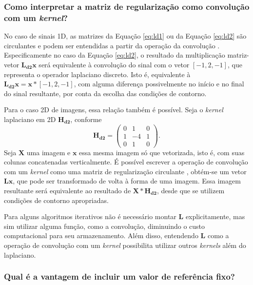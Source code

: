 \subsubsection{Como interpretar a matriz de regularização como convolução com um \textit{kernel}?}

No caso de sinais 1D, as matrizes da Equação \eqref{eq:ld1}  ou da Equação \eqref{eq:ld2} são circulantes e podem ser entendidas a partir da operação da convolução \cite[pág. 232]{aster2019parameter}. Especificamente no caso da Equação \eqref{eq:ld2}, o resultado da multiplicação matriz-vetor $\mathbf{L_{d2}} \mathbf{x}$ será equivalente à convolução do sinal com o vetor $[-1 , 2, -1]$, que representa o operador laplaciano discreto. Isto é, equivalente à $\mathbf{L_{d2}} \mathbf{x} = \mathbf{x} * [-1 , 2, -1]$, com alguma diferença possivelmente no início e no final do sinal resultante, por conta da escolha das condições de contorno.

 Para o caso 2D de imagens, essa relação também é possível. Seja o \textit{kernel} laplaciano em 2D $\mathbf{H_{d2}}$, conforme 
\begin{equation}
\mathbf{H_{d2}} = \begin{pmatrix}
0 & 1 & 0  \\
1 & -4 & 1\\
0 & 1 & 0 
\end{pmatrix}.
\label{eq:hd2}
\end{equation}
Seja $\mathbf{X}$ uma imagem e $\mathbf{x}$ essa mesma imagem só que vetorizada, isto é, com suas colunas concatenadas verticalmente. É possível escrever a operação de convolução com um \textit{kernel} como uma matriz de regularização circulante \cite[pág. 177]{hansen2010discrete}, obtém-se um vetor $\mathbf{L} \mathbf{x}$, que pode ser transformado de volta à forma de uma imagem. Essa imagem resultante será equivalente ao resultado de $\mathbf{X} *\mathbf{H_{d2}}$, desde que se utilizem condições de contorno apropriadas. 

Para alguns algoritmos iterativos não é necessário montar $\mathbf{L}$ explicitamente, mas sim utilizar alguma função, como a convolução, diminuindo o custo computacional para seu armazenamento. Além disso, entendendo $\mathbf{L}$ como a operação de convolução com um \textit{kernel} possibilita utilizar outros \textit{kernels} além do laplaciano. 


\subsubsection{Qual é a vantagem de incluir um valor de referência fixo?}

